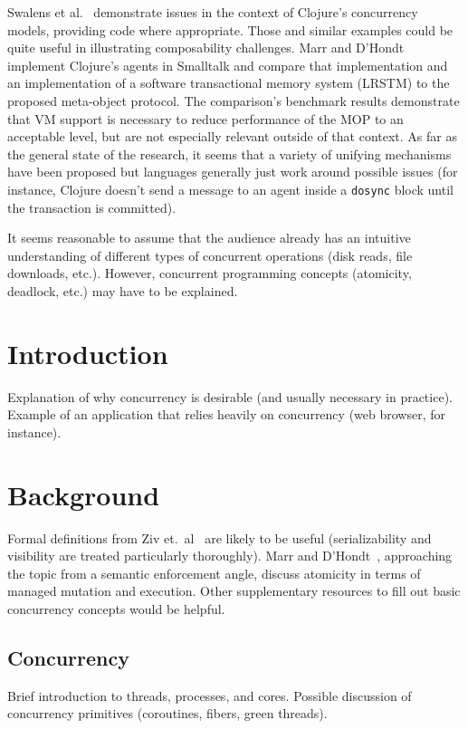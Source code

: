 \documentclass{sig-alternate}
\newcommand{\code}[1]{\texttt{#1}}
\begin{document}
Swalens et al.~\cite{Swalens2014} demonstrate issues in the context of Clojure's concurrency models, providing code where appropriate. Those and similar examples could be quite useful in illustrating composability challenges. Marr and D'Hondt~\cite{Marr2012} implement Clojure's agents in Smalltalk and compare that implementation and an implementation of a software transactional memory system (LRSTM) to the proposed meta-object protocol. The comparison's benchmark results demonstrate that VM support is necessary to reduce performance of the MOP to an acceptable level, but are not especially relevant outside of that context. As far as the general state of the research, it seems that a variety of unifying mechanisms have been proposed but languages generally just work around possible issues (for instance, Clojure doesn't send a message to an agent inside a \code{dosync} block until the transaction is committed).

It seems reasonable to assume that the audience already has an intuitive understanding of different types of concurrent operations (disk reads, file downloads, etc.). However, concurrent programming concepts (atomicity, deadlock, etc.) may have to be explained.

\section{Introduction}

Explanation of why concurrency is desirable (and usually necessary in practice). Example of an application that relies heavily on concurrency (web browser, for instance).

\section{Background}

Formal definitions from Ziv et.\ al~\cite{Ziv2015} are likely to be useful (serializability and visibility are treated particularly thoroughly). Marr and D'Hondt~\cite{Marr2012}, approaching the topic from a semantic enforcement angle, discuss atomicity in terms of managed mutation and execution. Other supplementary resources to fill out basic concurrency concepts would be helpful.

\subsection{Concurrency}

Brief introduction to threads, processes, and cores. Possible discussion of concurrency primitives (coroutines, fibers, green threads).
\end{document}
